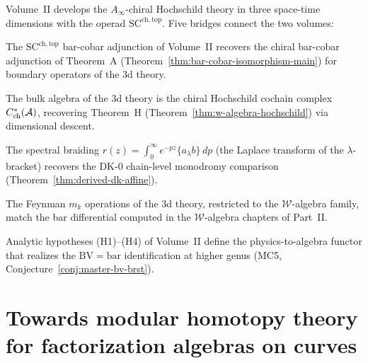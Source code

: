 Volume~II develops the $A_\infty$-chiral Hochschild theory in
three space-time dimensions with the operad
$\mathrm{SC}^{\mathrm{ch,top}}$.  Five bridges connect the two
volumes:

\begin{conjecture}
\label{conj:vol2-bar-cobar-bridge}
The $\mathrm{SC}^{\mathrm{ch,top}}$ bar-cobar adjunction of
Volume~II recovers the chiral bar-cobar adjunction of Theorem~A
(Theorem~\ref{thm:bar-cobar-isomorphism-main}) for boundary
operators of the 3d theory.
\end{conjecture}

\begin{conjecture}
\label{conj:vol2-hochschild-bridge}
The bulk algebra of the 3d theory is the chiral Hochschild cochain
complex $C^*_{\mathrm{ch}}(\mathcal{A})$, recovering Theorem~H
(Theorem~\ref{thm:w-algebra-hochschild}) via dimensional
descent.
\end{conjecture}

\begin{conjecture}
\label{conj:vol2-dk-ybe-bridge}
The spectral braiding $r(z) = \int_0^\infty e^{-pz}
\{a_\lambda b\}\,dp$ (the Laplace transform of the
$\lambda$-bracket) recovers the DK-0 chain-level
monodromy comparison (Theorem~\ref{thm:derived-dk-affine}).
\end{conjecture}

\begin{conjecture}
\label{conj:vol2-w-algebra-bridge}
The Feynman $m_k$ operations of the 3d theory, restricted to
the $\mathcal{W}$-algebra family, match the bar differential computed in the
$\mathcal{W}$-algebra chapters of Part~II.
\end{conjecture}

\begin{conjecture}
\label{conj:vol2-bv-functor-bridge}
Analytic hypotheses (H1)--(H4) of Volume~II define the
physics-to-algebra functor that realizes the
$\mathrm{BV} = \mathrm{bar}$ identification at higher
genus (MC5, Conjecture~\ref{conj:master-bv-brst}).
\end{conjecture}


\section[Towards modular homotopy theory]{Towards modular homotopy theory for factorization algebras on curves}
\label{sec:modular-koszul-programme}

